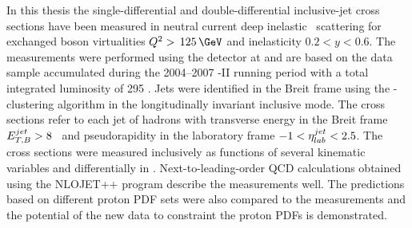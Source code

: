 In this thesis the single-differential and double-differential inclusive-jet cross sections have been measured in neutral current deep inelastic \ep\, scattering for exchanged boson virtualities $\qsq>\,125\,\GeV$ and inelasticity $0.2<y<0.6$. The measurements were performed using the \zeus detector at \hera and are based on the data sample accumulated during the 2004--2007 \hera-II running period with a total integrated luminosity of 295 \invpb. Jets were identified in the Breit frame using the \kt-clustering algorithm in the longitudinally invariant inclusive mode. The cross sections refer to each jet of hadrons with transverse energy in the Breit frame $\mbox{$E_{T,B}^{jet}$} > 8$ \GeV\, and pseudorapidity in the laboratory frame $-1<\mbox{$\eta^{jet}_{lab}$}<2.5$. The cross sections were measured inclusively as functions of several kinematic variables and differentially in \qsq. Next-to-leading-order QCD calculations obtained using the NLOJET++ program describe the measurements well. The predictions based on different proton PDF sets were also compared to the measurements and the potential of the new data to constraint the proton PDFs is demonstrated.